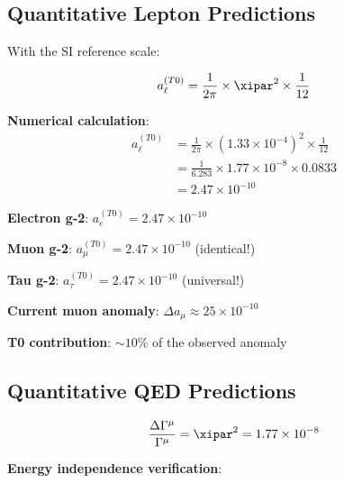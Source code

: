 	\subsection{Quantitative Lepton Predictions}
	
	With the SI reference scale:
	
	\begin{equation}
		a_{\ell}^{(T0)} = \frac{1}{2\pi} \times \xipar^2 \times \frac{1}{12}
		\label{eq:quantitative_lepton_correction}
	\end{equation}
	
	\textbf{Numerical calculation}:
	\begin{align}
		a_{\ell}^{(T0)} &= \frac{1}{2\pi} \times (1.33 \times 10^{-4})^2 \times \frac{1}{12} \\
		&= \frac{1}{6.283} \times 1.77 \times 10^{-8} \times 0.0833 \\
		&= 2.47 \times 10^{-10}
	\end{align}
	
	\begin{tcolorbox}[colback=blue!5!white,colframe=blue!75!black,title=Universal Lepton Prediction]
		\textbf{Electron g-2}: $a_e^{(T0)} = 2.47 \times 10^{-10}$
		
		\textbf{Muon g-2}: $a_{\mu}^{(T0)} = 2.47 \times 10^{-10}$ (identical!)
		
		\textbf{Tau g-2}: $a_{\tau}^{(T0)} = 2.47 \times 10^{-10}$ (universal!)
		
		\textbf{Current muon anomaly}: $\Delta a_{\mu} \approx 25 \times 10^{-10}$
		
		\textbf{T0 contribution}: $\sim 10\%$ of the observed anomaly
	\end{tcolorbox}
	
	\subsection{Quantitative QED Predictions}
	
	\begin{equation}
		\frac{\Delta\Gamma^{\mu}}{\Gamma^{\mu}} = \xipar^2 = 1.77 \times 10^{-8}
		\label{eq:quantitative_qed_correction}
	\end{equation}
	
	\textbf{Energy independence verification}:
	\begin{table}[htbp]
		\centering
		\caption{Energy-independent T0 corrections vs. Standard Model}
	\end{table}
	
